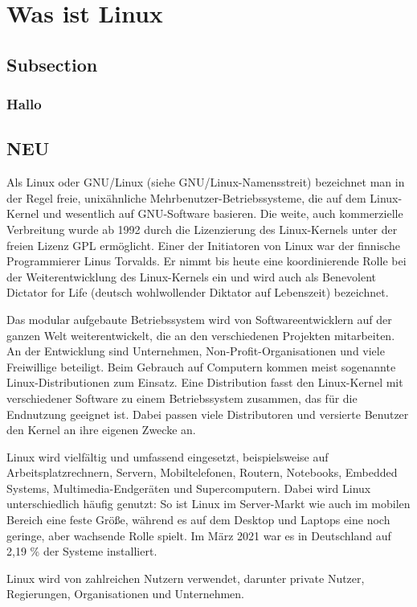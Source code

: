\section*{Was ist Linux}
\subsection*{Subsection}
\subsubsection*{Hallo}
\subsection*{NEU}

Als Linux oder GNU/Linux (siehe GNU/Linux-Namensstreit) bezeichnet man in der Regel freie, unixähnliche Mehrbenutzer-Betriebssysteme, die auf dem Linux-Kernel und wesentlich auf GNU-Software basieren. Die weite, auch kommerzielle Verbreitung wurde ab 1992 durch die Lizenzierung des Linux-Kernels unter der freien Lizenz GPL ermöglicht. Einer der Initiatoren von Linux war der finnische Programmierer Linus Torvalds. Er nimmt bis heute eine koordinierende Rolle bei der Weiterentwicklung des Linux-Kernels ein und wird auch als Benevolent Dictator for Life (deutsch wohlwollender Diktator auf Lebenszeit) bezeichnet.

Das modular aufgebaute Betriebssystem wird von Softwareentwicklern auf der ganzen Welt weiterentwickelt, die an den verschiedenen Projekten mitarbeiten. An der Entwicklung sind Unternehmen, Non-Profit-Organisationen und viele Freiwillige beteiligt. Beim Gebrauch auf Computern kommen meist sogenannte Linux-Distributionen zum Einsatz. Eine Distribution fasst den Linux-Kernel mit verschiedener Software zu einem Betriebssystem zusammen, das für die Endnutzung geeignet ist. Dabei passen viele Distributoren und versierte Benutzer den Kernel an ihre eigenen Zwecke an.

Linux wird vielfältig und umfassend eingesetzt, beispielsweise auf Arbeitsplatzrechnern, Servern, Mobiltelefonen, Routern, Notebooks, Embedded Systems, Multimedia-Endgeräten und Supercomputern. Dabei wird Linux unterschiedlich häufig genutzt: So ist Linux im Server-Markt wie auch im mobilen Bereich eine feste Größe, während es auf dem Desktop und Laptops eine noch geringe, aber wachsende Rolle spielt. Im März 2021 war es in Deutschland auf 2,19 \% der Systeme installiert.

Linux wird von zahlreichen Nutzern verwendet, darunter private Nutzer, Regierungen, Organisationen und Unternehmen.
